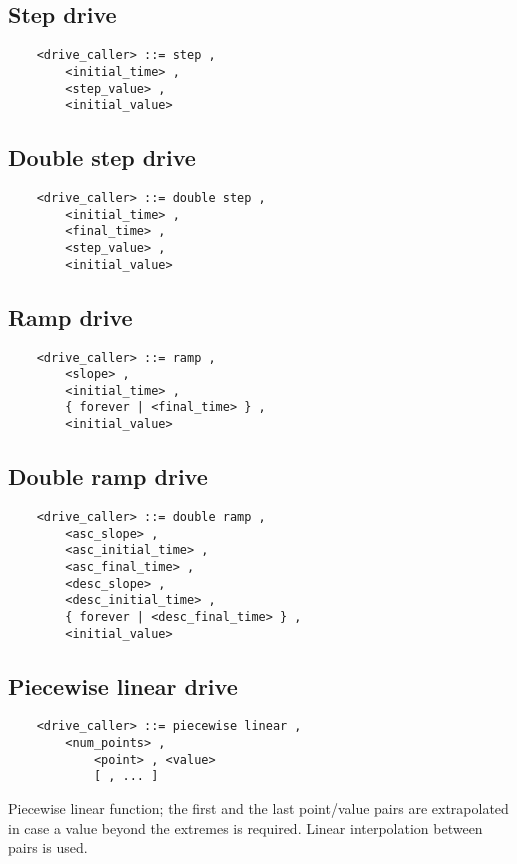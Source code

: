 \subsection{Step drive}
\begin{verbatim}
    <drive_caller> ::= step ,
        <initial_time> , 
        <step_value> ,
        <initial_value>
\end{verbatim}    

\subsection{Double step drive}
\begin{verbatim}
    <drive_caller> ::= double step ,
        <initial_time> , 
        <final_time> ,
        <step_value> , 
        <initial_value>
\end{verbatim}

\subsection{Ramp drive}
\begin{verbatim}
    <drive_caller> ::= ramp ,
        <slope> , 
        <initial_time> ,
        { forever | <final_time> } ,
        <initial_value>
\end{verbatim}
  
\subsection{Double ramp drive}
\begin{verbatim}
    <drive_caller> ::= double ramp ,
        <asc_slope> , 
        <asc_initial_time> , 
        <asc_final_time> , 
        <desc_slope> , 
        <desc_initial_time> , 
        { forever | <desc_final_time> } , 
        <initial_value>
\end{verbatim}

\subsection{Piecewise linear drive}
\begin{verbatim}
    <drive_caller> ::= piecewise linear ,
        <num_points> ,
            <point> , <value> 
            [ , ... ]
\end{verbatim}
Piecewise linear function; the first and the last point/value pairs are
extrapolated in case a value beyond the extremes is required.
Linear interpolation between pairs is used.

